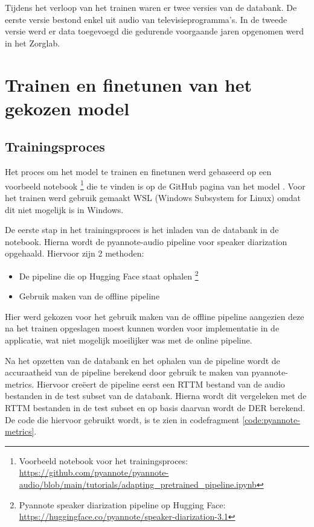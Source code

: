 Tijdens het verloop van het trainen waren er twee versies van de databank. De eerste versie bestond enkel uit audio van televisieprogramma's. In de tweede versie werd er data toegevoegd die gedurende voorgaande jaren opgenomen werd in het Zorglab.

\section{Trainen en finetunen van het gekozen model}
\label{sec:trainen}

\subsection{Trainingsproces}
\label{subsec:proces}
Het proces om het model te trainen en finetunen werd gebaseerd op een voorbeeld notebook \footnote{Voorbeeld notebook voor het trainingsproces: \url{https://github.com/pyannote/pyannote-audio/blob/main/tutorials/adapting_pretrained_pipeline.ipynb}} die te vinden is op de GitHub pagina van het model \autocite{Bredin2024}. Voor het trainen werd gebruik gemaakt WSL (Windows Subsystem for Linux) omdat dit niet mogelijk is in Windows.

De eerste stap in het trainingsproces is het inladen van de databank in de notebook. Hierna wordt de pyannote-audio pipeline voor speaker diarization opgehaald. Hiervoor zijn 2 methoden:
\begin{itemize}
	\item De pipeline die op Hugging Face staat ophalen \footnote{Pyannote speaker diarization pipeline op Hugging Face: \url{https://huggingface.co/pyannote/speaker-diarization-3.1}}
	\item Gebruik maken van de offline pipeline
\end{itemize}
Hier werd gekozen voor het gebruik maken van de offline pipeline aangezien deze na het trainen opgeslagen moest kunnen worden voor implementatie in de applicatie, wat niet mogelijk moeilijker was met de online pipeline.

Na het opzetten van de databank en het ophalen van de pipeline wordt de accuraatheid van de pipeline berekend door gebruik te maken van pyannote-metrics. Hiervoor creëert de pipeline eerst een RTTM bestand van de audio bestanden in de test subset van de databank. Hierna wordt dit vergeleken met de RTTM bestanden in de test subset en op basis daarvan wordt de DER berekend. De code die hiervoor gebruikt wordt, is te zien in codefragment \ref{code:pyannote-metrics}.

